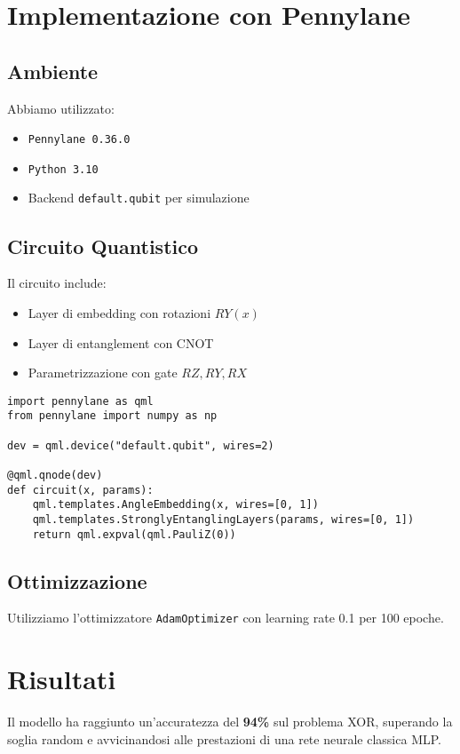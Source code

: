 \documentclass[10pt,twocolumn]{article}
\begin{document}
\section{Implementazione con Pennylane}
\subsection{Ambiente}
Abbiamo utilizzato:
\begin{itemize}
    \item \texttt{Pennylane 0.36.0}
    \item \texttt{Python 3.10}
    \item Backend \texttt{default.qubit} per simulazione
\end{itemize}

\subsection{Circuito Quantistico}
Il circuito include:
\begin{itemize}
    \item Layer di embedding con rotazioni \( RY(x) \)
    \item Layer di entanglement con CNOT
    \item Parametrizzazione con gate \( RZ, RY, RX \)
\end{itemize}

\begin{lstlisting}
import pennylane as qml
from pennylane import numpy as np

dev = qml.device("default.qubit", wires=2)

@qml.qnode(dev)
def circuit(x, params):
    qml.templates.AngleEmbedding(x, wires=[0, 1])
    qml.templates.StronglyEntanglingLayers(params, wires=[0, 1])
    return qml.expval(qml.PauliZ(0))
\end{lstlisting}

\subsection{Ottimizzazione}
Utilizziamo l’ottimizzatore \texttt{AdamOptimizer} con learning rate 0.1 per 100 epoche.

\section{Risultati}
Il modello ha raggiunto un’accuratezza del \textbf{94\%} sul problema XOR, superando la soglia random e avvicinandosi alle prestazioni di una rete neurale classica MLP.
\end{document}
